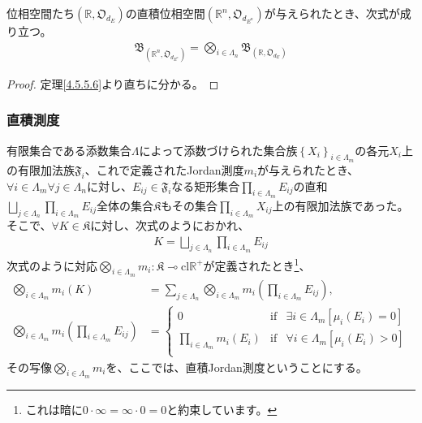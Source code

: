 \documentclass[dvipdfmx]{jsarticle}
\begin{document}
\begin{thm}\label{4.5.5.7}
位相空間たち$\left( \mathbb{R},\mathfrak{O}_{d_{E}} \right)$の直積位相空間$\left( \mathbb{R}^{n},\mathfrak{O}_{d_{E^{n}}} \right)$が与えられたとき、次式が成り立つ。
\begin{align*}
\mathfrak{B}_{\left( \mathbb{R}^{n},\mathfrak{O}_{d_{E^{n}}} \right)} = \bigotimes_{i \in \varLambda_{n} } \mathfrak{B}_{\left( \mathbb{R},\mathfrak{O}_{d_{E}} \right)}
\end{align*}
\end{thm}
\begin{proof} 定理\ref{4.5.5.6}より直ちに分かる。
\end{proof}
\subsubsection{直積測度}%
\begin{dfn}
有限集合である添数集合$\varLambda$によって添数づけられた集合族$\left\{ X_{i} \right\}_{i \in \varLambda_{m}}$の各元$X_{i}$上の有限加法族$\mathfrak{F}_{i}$、これで定義されたJordan測度$m_{i}$が与えられたとき、$\forall i \in \varLambda_{m}\forall j \in \varLambda_{n}$に対し、$E_{ij} \in \mathfrak{F}_{i}$なる矩形集合$\prod_{i \in \varLambda_{m}} E_{ij}$の直和$\bigsqcup_{j \in \varLambda_{n}} {\prod_{i \in \varLambda_{m}} E_{ij}}$全体の集合$\mathfrak{K}$もその集合$\prod_{i \in \varLambda_{m}} X_{ij}$上の有限加法族であった。そこで、$\forall K \in \mathfrak{K}$に対し、次式のようにおかれ、
\begin{align*}
K = \bigsqcup_{j \in \varLambda_{n}} {\prod_{i \in \varLambda_{m}} E_{ij}}
\end{align*}
次式のように対応$\bigotimes_{i \in \varLambda_{m}} m_{i}\mathfrak{:K \multimap}\mathrm{cl}\mathbb{R}^{+}$が定義されたとき\footnote{これは暗に$0 \cdot \infty = \infty \cdot 0 = 0$と約束しています。}、
\begin{align*}
\bigotimes_{i \in \varLambda_{m}} m_{i}(K) &= \sum_{j \in \varLambda_{n}} {\bigotimes_{i \in \varLambda_{m}} m_{i}\left( \prod_{i \in \varLambda_{m}} E_{ij} \right)},\\
\bigotimes_{i \in \varLambda_{m}} m_{i}\left( \prod_{i \in \varLambda_{m}} E_{ij} \right) &= \left\{ \begin{matrix}
0 & \mathrm{if} & \exists i \in \varLambda_{m}\left[ \mu_{i}\left( E_{i} \right) = 0 \right] \\
\prod_{i \in \varLambda_{m}} {m_{i}\left( E_{i} \right)} & \mathrm{if} & \forall i \in \varLambda_{m}\left[ \mu_{i}\left( E_{i} \right) > 0 \right] \\
\end{matrix} \right.\ 
\end{align*}
その写像$\bigotimes_{i \in \varLambda_{m}} m_{i}$を、ここでは、直積Jordan測度ということにする。
\end{dfn}\par
\end{document}
